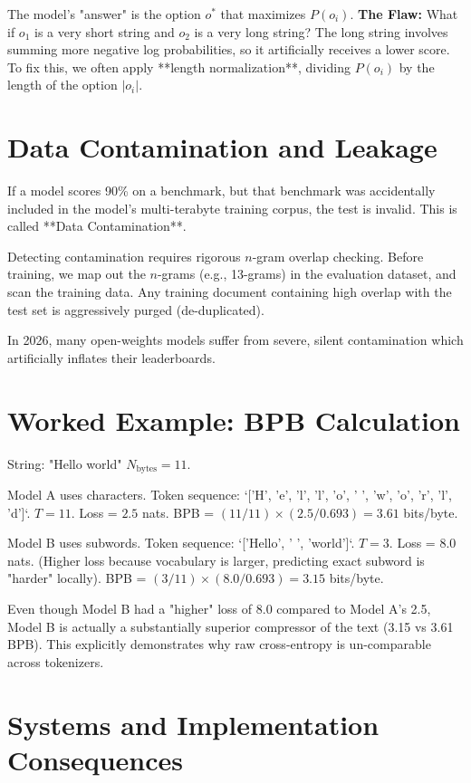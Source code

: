 The model's "answer" is the option $o^*$ that maximizes $P(o_i)$.
\textbf{The Flaw:} What if $o_1$ is a very short string and $o_2$ is a very long string? The long string involves summing more negative log probabilities, so it artificially receives a lower score. To fix this, we often apply **length normalization**, dividing $P(o_i)$ by the length of the option $|o_i|$.

\section{Data Contamination and Leakage}

If a model scores 90\% on a benchmark, but that benchmark was accidentally included in the model's multi-terabyte training corpus, the test is invalid. This is called **Data Contamination**.

Detecting contamination requires rigorous $n$-gram overlap checking. Before training, we map out the $n$-grams (e.g., 13-grams) in the evaluation dataset, and scan the training data. Any training document containing high overlap with the test set is aggressively purged (de-duplicated). 

In 2026, many open-weights models suffer from severe, silent contamination which artificially inflates their leaderboards. 

\section{Worked Example: BPB Calculation}
\label{ch:13:sec:example}

String: "Hello world"
$N_{\text{bytes}} = 11$.

Model A uses characters. Token sequence: `['H', 'e', 'l', 'l', 'o', ' ', 'w', 'o', 'r', 'l', 'd']`.
$T=11$. 
Loss = $2.5$ nats.
BPB = $(11 / 11) \times (2.5 / 0.693) = 3.61$ bits/byte.

Model B uses subwords. Token sequence: `['Hello', ' ', 'world']`.
$T=3$. 
Loss = $8.0$ nats. (Higher loss because vocabulary is larger, predicting exact subword is "harder" locally).
BPB = $(3 / 11) \times (8.0 / 0.693) = 3.15$ bits/byte.

Even though Model B had a "higher" loss of 8.0 compared to Model A's 2.5, Model B is actually a substantially superior compressor of the text (3.15 vs 3.61 BPB). This explicitly demonstrates why raw cross-entropy is un-comparable across tokenizers.

\section{Systems and Implementation Consequences}
\label{ch:13:sec:systems}

